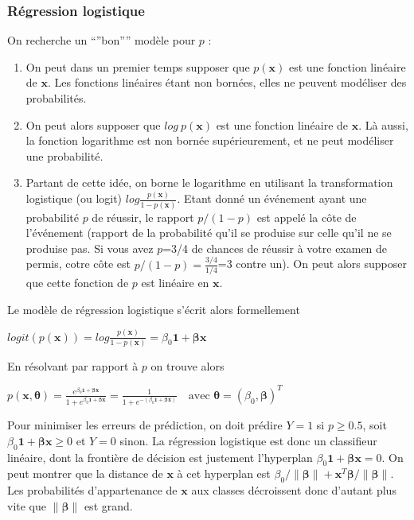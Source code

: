 \documentclass[letterpaper,10pt,french]{sphinxmanual}
\begin{document}
\subsubsection{Régression logistique}
\label{\detokenize{regression:id3}}
\sphinxAtStartPar
On recherche un “”bon”” modèle pour \(p\) :
\begin{enumerate}
%
\item {} 
\sphinxAtStartPar
On peut dans un premier temps supposer que \(p(\mathbf x)\) est une fonction linéaire de \(\mathbf x\). Les fonctions linéaires étant non bornées, elles ne peuvent modéliser des probabilités.

\item {} 
\sphinxAtStartPar
On peut alors supposer que \(log\ p(\mathbf x)\) est une fonction linéaire de \(\mathbf x\). Là aussi, la fonction logarithme est non bornée supérieurement, et ne peut modéliser une probabilité.

\item {} 
\sphinxAtStartPar
Partant de cette idée, on borne le logarithme en utilisant la transformation logistique (ou logit) \(log\frac{p(\mathbf x)}{1-p(\mathbf x)}\). Etant donné un événement ayant une probabilité \(p\) de réussir, le rapport \(p/(1-p)\) est appelé la côte de l’événement (rapport de la probabilité qu’il se produise sur celle qu’il ne se produise pas. Si vous avez \(p\)=3/4 de chances de réussir à votre examen de permis, cotre côte est \(p/(1-p)=\frac{3/4}{1/4}\)=3 contre un). On peut alors supposer que cette fonction de \(p\) est linéaire en \(\mathbf x\).

\end{enumerate}

\sphinxAtStartPar
Le modèle de régression logistique s’écrit alors formellement

\sphinxAtStartPar
\(logit(p(\mathbf x)) = log \frac{p(\mathbf x)}{1-p(\mathbf x)} = \beta_0\mathbf 1 + \boldsymbol\beta\mathbf x\)

\sphinxAtStartPar
En résolvant par rapport à \(p\) on trouve alors

\sphinxAtStartPar
\(p(\mathbf x,\boldsymbol\theta) = \frac{e^{\beta_0\mathbf 1 + \boldsymbol\beta\mathbf x}}{1+e^{\beta_0\mathbf 1 + \boldsymbol\beta\mathbf x}}=\frac{1}{1+e^{-(\beta_0\mathbf 1 + \boldsymbol\beta\mathbf x)}}\quad\text{avec }\boldsymbol\theta=(\beta_0,\boldsymbol\beta)^T\)

\sphinxAtStartPar
Pour minimiser les erreurs de prédiction, on doit prédire \(Y=1\) si \(p\geq 0.5\), soit \(\beta_0\mathbf 1 + \boldsymbol\beta\mathbf x\geq 0\) et \(Y=0\) sinon. La régression logistique est donc un classifieur linéaire, dont la frontière de décision est justement l’hyperplan \(\beta_0\mathbf 1 + \boldsymbol\beta\mathbf x= 0\). On peut montrer que la distance de \(\mathbf x\) à cet hyperplan est \(\beta_0/\|\boldsymbol\beta\| + \mathbf x^T\boldsymbol\beta/\|\boldsymbol\beta\|\). Les probabilités d’appartenance de \(\mathbf x\) aux classes décroissent donc d’autant plus vite que \(\|\boldsymbol\beta\|\) est grand.
\end{document}

